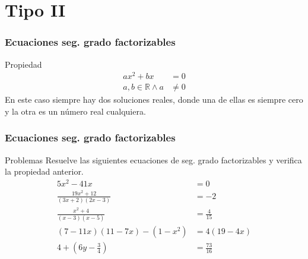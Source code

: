 \documentclass[12pt,spanish,x11names]{beamer}
\def\RR{\mathbb{R}}
\begin{document}
\section{Tipo II}
\begin{frame}
  \frametitle{Ecuaciones seg. grado factorizables}
  \begin{block}{Propiedad}
    \begin{align*}
      ax^2+bx&=0\\
      a,b\in\RR\wedge a&\neq0
    \end{align*}
    En este caso siempre hay dos soluciones reales, donde una de ellas es
    siempre cero y la otra es un número real cualquiera.
  \end{block}
\end{frame}
\begin{frame}
  \frametitle{Ecuaciones seg. grado factorizables}
  \begin{exampleblock}{Problemas}
    Resuelve las siguientes ecuaciones de seg. grado factorizables y verifica la
    propiedad anterior.
    \begin{align}
      5x^2-41x&=0\\
      \frac{19x^2+12}{(3x+2)(2x-3)}&=-2\\
      \frac{x^2+4}{(x-3)(x-5)}&=\frac{4}{15}\\
      (7-11x)(11-7x)-(1-x^2)&=4(19-4x)\\
      4+\left(6y-\frac{3}{4}\right)&=\frac{73}{16}
    \end{align}
  \end{exampleblock}
\end{frame}
\end{document}
